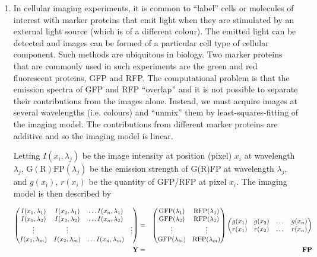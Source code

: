 \documentclass[12pt,a4paper]{tufte-handout}
\begin{document}
\begin{enumerate}

      \item In cellular imaging experiments, it is common to ``label'' cells or molecules of interest with marker proteins that emit light when they are stimulated by an external light source (which is of a different colour). The emitted light can be detected and images can be formed of a particular cell type of cellular component. Such methods are ubiquitous in biology. Two marker proteins that are commonly used in such experiments are the green and red fluorescent proteins, GFP and RFP. The computational problem is that the emission spectra of GFP and RFP ``overlap''  and it is not possible to separate their contributions from the images alone. Instead, we must acquire images at several wavelengths (i.e. colours) and ``unmix'' them by least-squares-fitting of the imaging model. The contributions from different marker proteins are additive and so the imaging model is linear.

Letting $I(x_i,\lambda_j)$ be the image intensity at position (pixel) $x_i$ at wavelength $\lambda_j$, $\mathrm{G(R)FP}(\lambda_j)$ be the emission strength of G(R)FP at wavelength $\lambda_j$, and $g(x_i)$, $r(x_i)$ be the quantity of GFP/RFP at pixel $x_i$. The imaging model is then described by

        \begin{eqnarray*}
          \begin{pmatrix}
            I(x_1,\lambda_1) & I(x_2,\lambda_1) & \dots I(x_n,\lambda_1) \\
            I(x_1,\lambda_2) & I(x_2,\lambda_2) & \dots I(x_n,\lambda_2) \\
            \vdots & \vdots & & \vdots \\
            I(x_1,\lambda_m) & I(x_2,\lambda_m) & \dots I(x_n,\lambda_m)
          \end{pmatrix}
          & = &
          \begin{pmatrix}
            \mathrm{GFP}(\lambda_1) & \mathrm{RFP}(\lambda_1) \\
            \mathrm{GFP}(\lambda_2) & \mathrm{RFP}(\lambda_2) \\
            \vdots & \vdots \\
            \mathrm{GFP}(\lambda_m) & \mathrm{RFP}(\lambda_m)
          \end{pmatrix}
          \begin{pmatrix}
            g(x_1) & g(x_2) & \dots & g(x_n) \\
            r(x_1) & r(x_2) & \dots & r(x_n) \\
          \end{pmatrix} \\
          \mathbf{Y} & = & \mathbf{F}\mathbf{P}
        \end{eqnarray*}
        

\end{enumerate}
\end{document}
